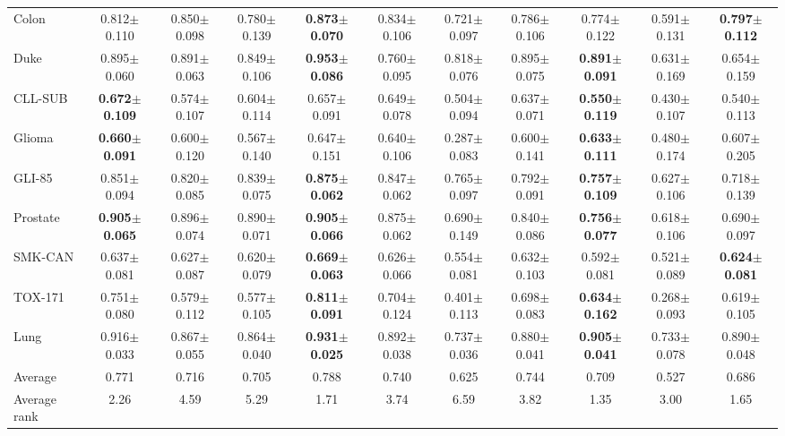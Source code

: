 \begin{table}[!t]
\begin{tabular*}{\textwidth}{@{\extracolsep{\fill}}lcccccccccc@{}}
Colon & 0.812$\pm$0.110 & 0.850$\pm$0.098 & 0.780$\pm$0.139 & \textbf{0.873$\pm$0.070} & 0.834$\pm$0.106 & 0.721$\pm$0.097 & 0.786$\pm$0.106 & 0.774$\pm$0.122 & 0.591$\pm$0.131 & \textbf{0.797$\pm$0.112} \\
Duke & 0.895$\pm$0.060 & 0.891$\pm$0.063 & 0.849$\pm$0.106 & \textbf{0.953$\pm$0.086} & 0.760$\pm$0.095 & 0.818$\pm$0.076 & 0.895$\pm$0.075 & \textbf{0.891$\pm$0.091} & 0.631$\pm$0.169 & 0.654$\pm$0.159 \\
CLL-SUB & \textbf{0.672$\pm$0.109} & 0.574$\pm$0.107 & 0.604$\pm$0.114 & 0.657$\pm$0.091 & 0.649$\pm$0.078 & 0.504$\pm$0.094 & 0.637$\pm$0.071 & \textbf{0.550$\pm$0.119} & 0.430$\pm$0.107 & 0.540$\pm$0.113 \\
Glioma & \textbf{0.660$\pm$0.091} & 0.600$\pm$0.120 & 0.567$\pm$0.140 & 0.647$\pm$0.151 & 0.640$\pm$0.106 & 0.287$\pm$0.083 & 0.600$\pm$0.141 & \textbf{0.633$\pm$0.111} & 0.480$\pm$0.174 & 0.607$\pm$0.205 \\
GLI-85 & 0.851$\pm$0.094 & 0.820$\pm$0.085 & 0.839$\pm$0.075 & \textbf{0.875$\pm$0.062} & 0.847$\pm$0.062 & 0.765$\pm$0.097 & 0.792$\pm$0.091 & \textbf{0.757$\pm$0.109} & 0.627$\pm$0.106 & 0.718$\pm$0.139 \\
Prostate & \textbf{0.905$\pm$0.065} & 0.896$\pm$0.074 & 0.890$\pm$0.071 & \textbf{0.905$\pm$0.066} & 0.875$\pm$0.062 & 0.690$\pm$0.149 & 0.840$\pm$0.086 & \textbf{0.756$\pm$0.077} & 0.618$\pm$0.106 & 0.690$\pm$0.097 \\
SMK-CAN & 0.637$\pm$0.081 & 0.627$\pm$0.087 & 0.620$\pm$0.079 & \textbf{0.669$\pm$0.063} & 0.626$\pm$0.066 & 0.554$\pm$0.081 & 0.632$\pm$0.103 & 0.592$\pm$0.081 & 0.521$\pm$0.089 & \textbf{0.624$\pm$0.081} \\
TOX-171 & 0.751$\pm$0.080 & 0.579$\pm$0.112 & 0.577$\pm$0.105 & \textbf{0.811$\pm$0.091} & 0.704$\pm$0.124 & 0.401$\pm$0.113 & 0.698$\pm$0.083 & \textbf{0.634$\pm$0.162} & 0.268$\pm$0.093 & 0.619$\pm$0.105 \\
Lung & 0.916$\pm$0.033 & 0.867$\pm$0.055 & 0.864$\pm$0.040 & \textbf{0.931$\pm$0.025} & 0.892$\pm$0.038 & 0.737$\pm$0.036 & 0.880$\pm$0.041 & \textbf{0.905$\pm$0.041} & 0.733$\pm$0.078 & 0.890$\pm$0.048 \\
\midrule
Average & 0.771 & 0.716 & 0.705 & 0.788 & 0.740 & 0.625 & 0.744 & 0.709 & 0.527 & 0.686 \\
Average rank & 2.26 & 4.59 & 5.29 & 1.71 & 3.74 & 6.59 & 3.82 & 1.35 & 3.00 & 1.65 \\
\bottomrule
\end{tabular*}
\end{table}
